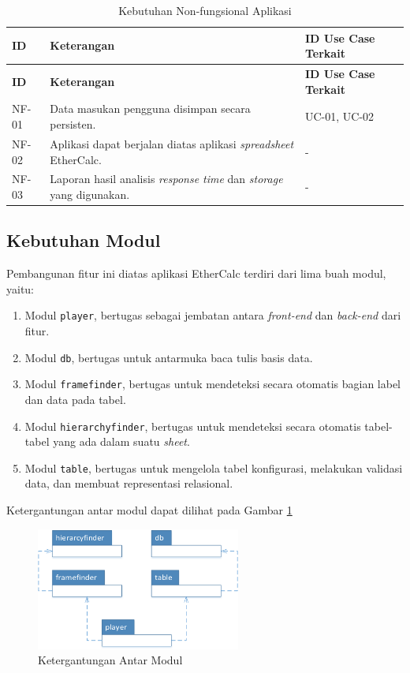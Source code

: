 	\begin{small}
	\begin{longtable}{ | p{2cm} | p{6cm} | p{4cm} | }
	    \caption{Kebutuhan Non-fungsional Aplikasi}
	    \label{KebutuhanNonfungsional}\\ \hline
	    \centering\bfseries{ID} & \centering\bfseries{Keterangan} & \centering\bfseries{ID Use Case Terkait} \tabularnewline \hline
	    \endfirsthead
	    \hline
	    \centering\bfseries{ID} & \centering\bfseries{Keterangan} & \centering\bfseries{ID Use Case Terkait} \tabularnewline \hline
	    \endhead
	    NF-01 & Data masukan pengguna disimpan secara persisten. & UC-01, UC-02 \\ \hline
	    NF-02 & Aplikasi dapat berjalan diatas aplikasi \textit{spreadsheet} EtherCalc. & - \\ \hline
	    NF-03 & Laporan hasil analisis \textit{response time} dan \textit{storage} yang digunakan. & - \\ \hline
	\end{longtable}
	\end{small}

	\subsection{Kebutuhan Modul} \label{KebutuhanModul}
	Pembangunan fitur ini diatas aplikasi EtherCalc terdiri dari lima buah modul, yaitu:
	\begin{enumerate}
		\item Modul \texttt{player}, bertugas sebagai jembatan antara \textit{front-end} dan \textit{back-end} dari fitur.
		\item Modul \texttt{db}, bertugas untuk antarmuka baca tulis basis data.
		\item Modul \texttt{framefinder}, bertugas untuk mendeteksi secara otomatis bagian label dan data pada tabel.
		\item Modul \texttt{hierarchyfinder}, bertugas untuk mendeteksi secara otomatis tabel-tabel yang ada dalam suatu \textit{sheet}.
		\item Modul \texttt{table}, bertugas untuk mengelola tabel konfigurasi, melakukan validasi data, dan membuat representasi relasional.
	\end{enumerate}

	Ketergantungan antar modul dapat dilihat pada Gambar \ref{ModuleDependency}

	\begin{figure}[htb]
	    \centering
	    \includegraphics[width=0.6\textwidth]{resources/chapter-4-module-dependecy.png}
	    \caption{Ketergantungan Antar Modul}
		\label{ModuleDependency}
	\end{figure}

